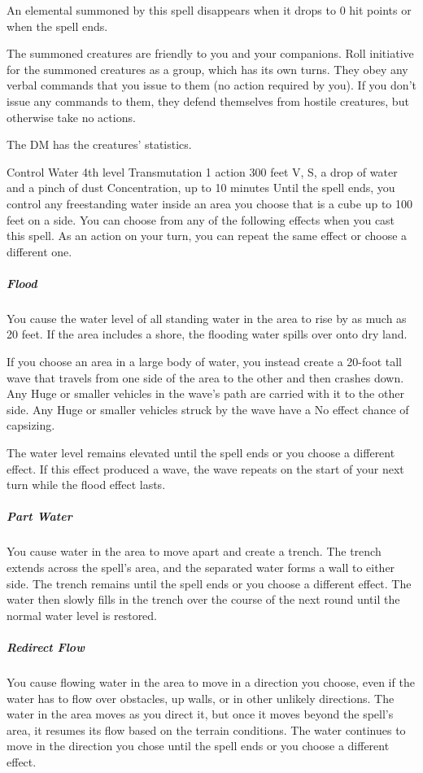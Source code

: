 \documentclass[10pt,a4paper,twoside,bg=print,twocolumn,openany,nodeprecatedcode]{dndbook}
\begin{document}
An elemental summoned by this spell disappears when it drops to 0 hit points or when the spell ends.

The summoned creatures are friendly to you and your companions. Roll initiative for the summoned creatures as a group, which has its own turns. They obey any verbal commands that you issue to them (no action required by you). If you don't issue any commands to them, they defend themselves from hostile creatures, but otherwise take no actions.

The DM has the creatures' statistics.



\DndSpellHeader%
{Control Water}
{4th level Transmutation}
{1 action}
{300 feet}
{V, S, a drop of water and a pinch of dust}
{Concentration, up to 10 minutes}
Until the spell ends, you control any freestanding water inside an area you choose that is a cube up to 100 feet on a side. You can choose from any of the following effects when you cast this spell. As an action on your turn, you can repeat the same effect or choose a different one.

\subparagraph{Flood}
You cause the water level of all standing water in the area to rise by as much as 20 feet. If the area includes a shore, the flooding water spills over onto dry land.

If you choose an area in a large body of water, you instead create a 20-foot tall wave that travels from one side of the area to the other and then crashes down. Any Huge or smaller vehicles in the wave's path are carried with it to the other side. Any Huge or smaller vehicles struck by the wave have a No effect chance of capsizing.

The water level remains elevated until the spell ends or you choose a different effect. If this effect produced a wave, the wave repeats on the start of your next turn while the flood effect lasts.

\subparagraph{Part Water}
You cause water in the area to move apart and create a trench. The trench extends across the spell's area, and the separated water forms a wall to either side. The trench remains until the spell ends or you choose a different effect. The water then slowly fills in the trench over the course of the next round until the normal water level is restored.

\subparagraph{Redirect Flow}
You cause flowing water in the area to move in a direction you choose, even if the water has to flow over obstacles, up walls, or in other unlikely directions. The water in the area moves as you direct it, but once it moves beyond the spell's area, it resumes its flow based on the terrain conditions. The water continues to move in the direction you chose until the spell ends or you choose a different effect.
\end{document}
